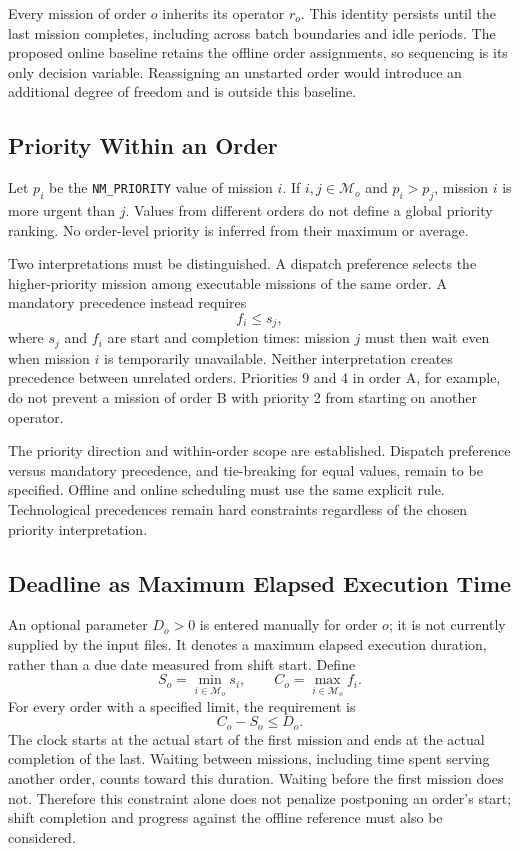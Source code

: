 Every mission of order $o$ inherits its operator $r_o$. This identity persists
until the last mission completes, including across batch boundaries and idle
periods. The proposed online baseline retains the offline order assignments,
so sequencing is its only decision variable. Reassigning an unstarted order
would introduce an additional degree of freedom and is outside this baseline.

\subsection{Priority Within an Order}

Let $p_i$ be the \texttt{NM\_PRIORITY} value of mission $i$. If
$i,j\in\mathcal M_o$ and $p_i>p_j$, mission $i$ is more urgent than $j$.
Values from different orders do not define a global priority ranking. No
order-level priority is inferred from their maximum or average.

Two interpretations must be distinguished. A dispatch preference selects
the higher-priority mission among executable missions of the same order.
A mandatory precedence instead requires
\begin{equation}
 f_i\leq s_j,
\end{equation}
where $s_j$ and $f_i$ are start and completion times: mission $j$ must then
wait even when mission $i$ is temporarily unavailable. Neither interpretation
creates precedence between unrelated orders. Priorities 9 and 4 in order A,
for example, do not prevent a mission of order B with priority 2 from
starting on another operator.

The priority direction and within-order scope are established. Dispatch
preference versus mandatory precedence, and tie-breaking for equal values,
remain to be specified. Offline and online scheduling must use the same
explicit rule. Technological precedences remain hard constraints regardless
of the chosen priority interpretation.

\subsection{Deadline as Maximum Elapsed Execution Time}

An optional parameter $D_o>0$ is entered manually for order $o$; it is not
currently supplied by the input files. It denotes a maximum elapsed execution
duration, rather than a due date measured from shift start. Define
\begin{equation}
 S_o=\min_{i\in\mathcal M_o}s_i,\qquad
 C_o=\max_{i\in\mathcal M_o}f_i.
\end{equation}
For every order with a specified limit, the requirement is
\begin{equation}
 C_o-S_o\leq D_o.
 \label{eq:order_duration_limit}
\end{equation}
The clock starts at the actual start of the first mission and ends at the
actual completion of the last. Waiting between missions, including time
spent serving another order, counts toward this duration. Waiting before
the first mission does not. Therefore this constraint alone does not penalize
postponing an order's start; shift completion and progress against the offline
reference must also be considered.

